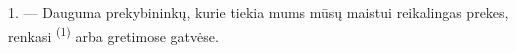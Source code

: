 %
%
%
%
%

\VUsaut{4.0mm}
\VUsaut{3.0mm}

\VUsaut{3.0mm}

1. --- Dauguma prekybininkų, kurie tiekia mums mūsų maistui reikalingas prekes,
renkasi   \textsuperscript{(1)} arba gretimose
gatvėse.

